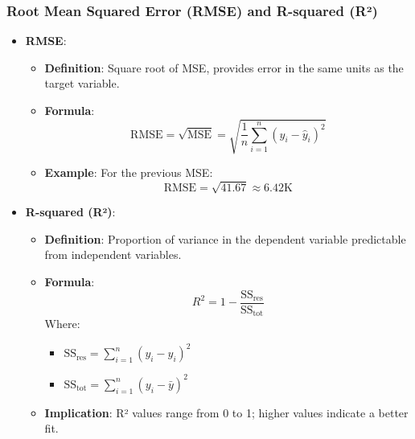\documentclass{beamer}
\begin{document}
\begin{frame}[fragile]
    \frametitle{Root Mean Squared Error (RMSE) and R-squared (R²)}
    \begin{itemize}
        \item \textbf{RMSE}:
        \begin{itemize}
            \item \textbf{Definition}: Square root of MSE, provides error in the same units as the target variable.
            \item \textbf{Formula}:  
            \begin{equation}
                \text{RMSE} = \sqrt{\text{MSE}} = \sqrt{\frac{1}{n} \sum_{i=1}^{n} (y_i - \hat{y}_i)^2}
            \end{equation}
            \item \textbf{Example}: For the previous MSE:
            \begin{equation}
                \text{RMSE} = \sqrt{41.67} \approx 6.42\text{K}
            \end{equation}
        \end{itemize}
    \end{itemize}

    \begin{itemize}
        \item \textbf{R-squared (R²)}:
        \begin{itemize}
            \item \textbf{Definition}: Proportion of variance in the dependent variable predictable from independent variables.
            \item \textbf{Formula}:  
            \begin{equation}
                R^2 = 1 - \frac{\text{SS}_{\text{res}}}{\text{SS}_{\text{tot}}}
            \end{equation}  
            Where:
            \begin{itemize}
                \item \(\text{SS}_{\text{res}} = \sum_{i=1}^{n} (y_i - \hat{y}_i)^2\)
                \item \(\text{SS}_{\text{tot}} = \sum_{i=1}^{n} (y_i - \bar{y})^2\)
            \end{itemize}
            \item \textbf{Implication}: R² values range from 0 to 1; higher values indicate a better fit.
        \end{itemize}
    \end{itemize}
\end{frame}
\end{document}
